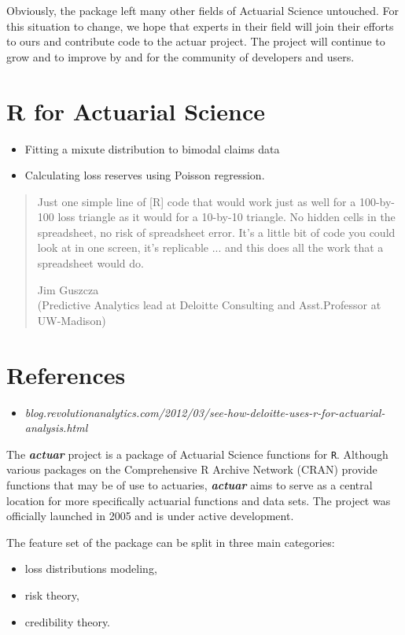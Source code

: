 \documentclass[12pt]{article}
\begin{document}
Obviously, the package left many other fields of Actuarial Science untouched. For this situation to change, we hope that experts in their field will join their efforts to ours and contribute code to the actuar project. The project will continue to grow and to improve by and for the community of developers and users.


\newpage
\section{R for Actuarial Science}
\begin{itemize}
\item Fitting a mixute distribution to bimodal claims data
\item Calculating loss reserves using Poisson regression.
\end{itemize}
\begin{quotation}
Just one simple line of [R] code that would work just as well for a 100-by-100 loss triangle as it would for a 10-by-10 triangle. No hidden cells in the spreadsheet, no risk of spreadsheet error. It's a little bit of code you could look at in one screen, it's replicable ... and this does all the work that a spreadsheet would do.

Jim Guszcza \\(Predictive Analytics lead at Deloitte Consulting and Asst.Professor at UW-Madison)
\end{quotation}

\section{References}
\begin{itemize}
\item \textit{\small{blog.revolutionanalytics.com/2012/03/see-how-deloitte-uses-r-for-actuarial-analysis.html}}
\end{itemize}

The \textbf{\textit{actuar}} project is a package of Actuarial Science functions for \texttt{R}. Although various packages on the Comprehensive R Archive Network (CRAN) provide functions that may be of use to actuaries, \textbf{\textit{actuar}} aims to serve as a central location for more specifically actuarial functions and data sets. The project was officially launched in 2005 and is under active development.

The feature set of the package can be split in three main categories: 
\begin{itemize}
\item loss distributions modeling,
\item risk theory,
\item credibility theory.
\end{itemize}
\end{document}
